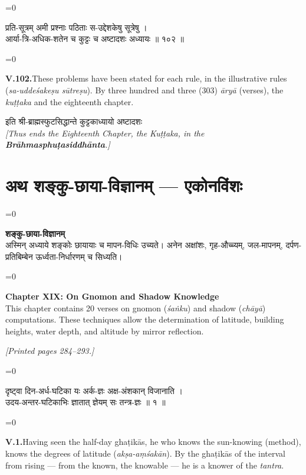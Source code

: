 \documentclass[11pt,a4paper]{article}
\newcommand{\cnote}[1]{\textcolor{notecolor}{\textit{#1}}}
\newcommand{\dev}[1]{{\devanagarifont\color{sktcolor}#1}}
\newcommand{\dsec}[1]{\section*{\dev{#1}}}
\newcommand{\iast}[1]{\textit{#1}}
\newenvironment{paracol}[1]{\begingroup}{\endgroup}
\newcommand{\switchcolumn}[1][]{%
  \ifnum#1=0\relax\else\par\nobreak\vspace{0.5em}\par\nobreak\fi%
}
\begin{document}
\vspace{0.3cm}

\begin{paracol}{2}
\switchcolumn[0]
\dev{%
प्रति-सूत्रम् अमी प्रश्नाः पठिताः स-उद्देशकेषु सूत्रेषु ।\\
आर्या-त्रि-अधिक-शतेन च कुट्टः च अष्टादशः अध्यायः ॥ १०२ ॥
}

\switchcolumn[1]
\textbf{V.102.}\quad These problems have been stated for each rule,
in the illustrative rules (\iast{sa-uddeśakeṣu sūtreṣu}). By
three hundred and three (303) \iast{āryā} (verses), the
\iast{kuṭṭaka} and the eighteenth chapter.
\end{paracol}

\vspace{0.5cm}

\begin{center}
\dev{इति श्री-ब्राह्मस्फुटसिद्धान्ते कुट्टकाध्यायो अष्टादशः}\\[0.3cm]
\textit{[Thus ends the Eighteenth Chapter, the Kuṭṭaka, in the
\textbf{Brāhmasphuṭasiddhānta}.]}
\end{center}

\newpage

\dsec{अथ शङ्कु-छाया-विज्ञानम् — एकोनविंशः}

\begin{paracol}{2}
\switchcolumn[0]
\dev{%
\textbf{शङ्कु-छाया-विज्ञानम्}\\[0.2cm]
अस्मिन् अध्याये शङ्कोः छायायाः च मापन-विधिः उच्यते।
अनेन अक्षांशः, गृह-औच्च्यम्, जल-मापनम्, दर्पण-प्रतिबिम्बेन
ऊर्ध्वता-निर्धारणम् च सिध्यति।
}

\switchcolumn[1]
\textbf{Chapter XIX: On Gnomon and Shadow Knowledge}\\[0.2cm]
This chapter contains 20 verses on gnomon (\iast{śaṅku}) and
shadow (\iast{chāyā}) computations. These techniques allow the
determination of latitude, building heights, water depth, and
altitude by mirror reflection.
\end{paracol}

\vspace{0.3cm}
\cnote{[Printed pages 284–293.]}
\vspace{0.3cm}

\begin{paracol}{2}
\switchcolumn[0]
\dev{%
दृष्ट्वा दिन-अर्ध-घटिका यः अर्क-ज्ञः अक्ष-अंशकान् विजानाति ।\\
उदय-अन्तर-घटिकाभिः ज्ञातात् ज्ञेयम् सः तन्त्र-ज्ञः ॥ १ ॥
}

\switchcolumn[1]
\textbf{V.1.}\quad Having seen the half-day ghaṭikās, he who knows
the sun-knowing (method), knows the degrees of latitude
(\iast{akṣa-aṃśakān}). By the ghaṭikās of the interval from
rising — from the known, the knowable — he is a knower of the
\iast{tantra}.
\end{paracol}
\end{document}
